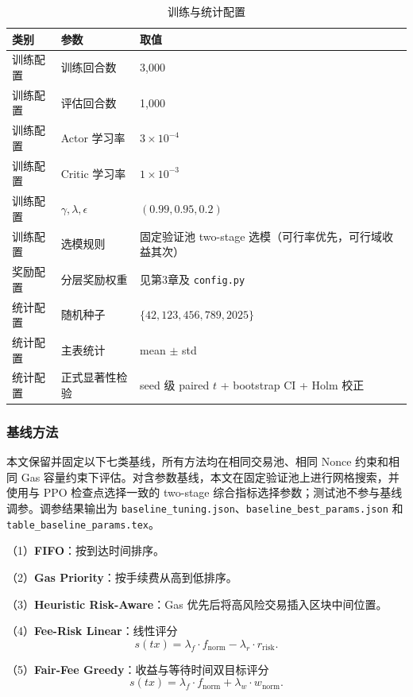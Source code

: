 \begin{table}[htbp]
\centering
\caption{训练与统计配置}
\label{tab:train_stats}
\begin{tabular}{lll}
\toprule
类别 & 参数 & 取值 \\
\midrule
训练配置 & 训练回合数 & 3{,}000 \\
训练配置 & 评估回合数 & 1{,}000 \\
训练配置 & Actor 学习率 & $3 \times 10^{-4}$ \\
训练配置 & Critic 学习率 & $1 \times 10^{-3}$ \\
训练配置 & $\gamma,\lambda,\epsilon$ & $(0.99, 0.95, 0.2)$ \\
训练配置 & 选模规则 & 固定验证池 two-stage 选模（可行率优先，可行域收益其次） \\
奖励配置 & 分层奖励权重 & 见第3章及 \texttt{config.py} \\
统计配置 & 随机种子 & $\{42,123,456,789,2025\}$ \\
统计配置 & 主表统计 & mean $\pm$ std \\
统计配置 & 正式显著性检验 & seed 级 paired $t$ + bootstrap CI + Holm 校正 \\
\bottomrule
\end{tabular}
\end{table}


\subsubsection{基线方法}

本文保留并固定以下七类基线，所有方法均在相同交易池、相同 Nonce 约束和相同 Gas 容量约束下评估。对含参数基线，本文在固定验证池上进行网格搜索，并使用与 PPO 检查点选择一致的 two-stage 综合指标选择参数；测试池不参与基线调参。调参结果输出为 \texttt{baseline\_tuning.json}、\texttt{baseline\_best\_params.json} 和 \texttt{table\_baseline\_params.tex}。

（1）\textbf{FIFO}：按到达时间排序。

（2）\textbf{Gas Priority}：按手续费从高到低排序。

（3）\textbf{Heuristic Risk-Aware}：Gas 优先后将高风险交易插入区块中间位置。

（4）\textbf{Fee-Risk Linear}：线性评分
\begin{equation}
  s(tx)=\lambda_f \cdot f_{\text{norm}} - \lambda_r \cdot r_{\text{risk}} .
\end{equation}

（5）\textbf{Fair-Fee Greedy}：收益与等待时间双目标评分
\begin{equation}
  s(tx)=\lambda_f \cdot f_{\text{norm}} + \lambda_w \cdot w_{\text{norm}} .
\end{equation}

